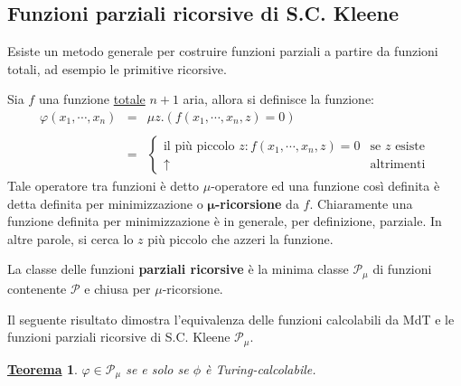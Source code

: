 \documentclass[a4paper]{article}
\newtheorem{theorem}{\textcolor{Red3}{\underline{Teorema}}}
\begin{document}
	\subsection{Funzioni parziali ricorsive di S.C. Kleene}
	
	Esiste un metodo generale per costruire funzioni parziali a partire da funzioni totali, ad esempio le primitive ricorsive.\newline
	
	\noindent
	Sia $f$ una funzione \underline{totale} $n+1$ aria, allora si definisce la funzione:
	\begin{equation*}
		\begin{array}{lll}
			\varphi\left(x_{1}, \cdots, x_{n}\right) & = & \mu z. \left(f\left(x_{1}, \cdots, x_{n}, z\right) = 0\right) \\
			&& \\
			& = & \begin{cases}
				\text{il più piccolo } z: f\left(x_{1}, \cdots, x_{n}, z\right) = 0		& \text{se } z \text{ esiste} \\
				\uparrow																& \text{altrimenti}
			\end{cases}
		\end{array}
	\end{equation*}
	Tale operatore tra funzioni è detto $\mu$-operatore ed una funzione così definita è detta definita per minimizzazione o \textcolor{Red3}{$\boldsymbol{\mu}$\textbf{-ricorsione}} da $f$. Chiaramente una funzione definita per minimizzazione è in generale, per definizione, parziale. In altre parole, si cerca lo $z$ più piccolo che azzeri la funzione.\newline
	
	\noindent
	La classe delle funzioni \textcolor{Red3}{\textbf{parziali ricorsive}} è la minima classe $\mathcal{P}_{\mu}$ di funzioni contenente $\mathcal{P}$ e chiusa per $\mu$-ricorsione.\newline
	
	\noindent
	Il seguente risultato dimostra l'equivalenza delle funzioni calcolabili da MdT e le funzioni parziali ricorsive di S.C. Kleene $\mathcal{P}_{\mu}$.
	\begin{theorem}
		$\varphi \in \mathcal{P}_{\mu}$ se e solo se $\phi$ è Turing-calcolabile.
	\end{theorem}
	
\end{document}
